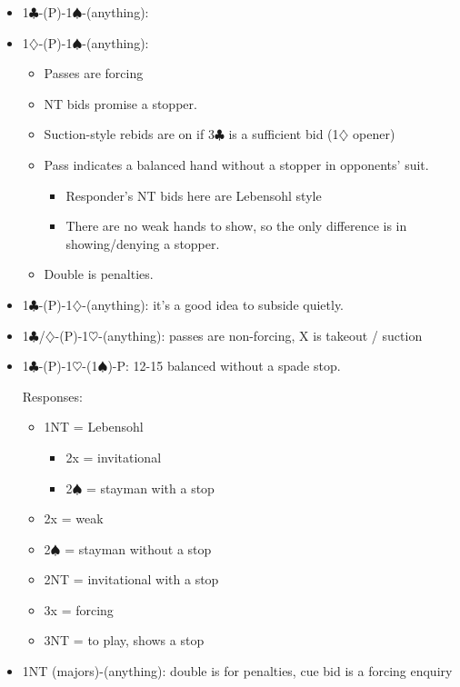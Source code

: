 \documentclass[a4paper,14pt]{extarticle}
\begin{document}
\begin{itemize}
\item 1$\clubsuit$-(P)-1$\spadesuit$-(anything):
\item 1$\diamondsuit$-(P)-1$\spadesuit$-(anything):
\begin{itemize}
   \item Passes are forcing
   \item NT bids promise a stopper.
   \item Suction-style rebids are on if 3$\clubsuit$ is a sufficient bid (1$\diamondsuit$ opener)
   \item Pass indicates a balanced hand without a stopper in opponents' suit.
	\begin{itemize}
      \item Responder's NT bids here are Lebensohl style 
      \item There are no weak hands to show, so the only difference is in showing/denying a stopper.
	\end{itemize}
   \item Double is penalties.
\end{itemize}

\item 1$\clubsuit$-(P)-1$\diamondsuit$-(anything): it's a good idea to subside quietly.  

\item 1$\clubsuit$/$\diamondsuit$-(P)-1$\heartsuit$-(anything): passes are non-forcing, X is takeout / suction

\newpage
\item 1$\clubsuit$-(P)-1$\heartsuit$-(1$\spadesuit$)-P: 12-15 balanced without a spade stop.

Responses:
	\begin{itemize}
	\item 1NT = Lebensohl
		\begin{itemize}
		\item 2x = invitational
		\item 2$\spadesuit$ = stayman with a stop
		\end{itemize}
	\item 2x = weak
	\item 2$\spadesuit$ = stayman without a stop
	\item 2NT = invitational with a stop
	\item 3x = forcing
	\item 3NT = to play, shows a stop
	\end{itemize}

\item 1NT (majors)-(anything): double is for penalties, cue bid is a forcing enquiry

\end{itemize}
\end{document}
